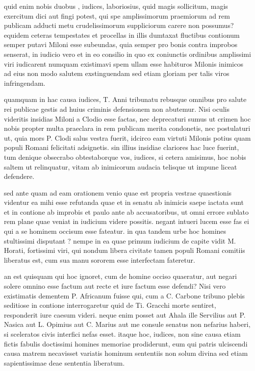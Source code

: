  quid enim nobis duobus , iudices, laboriosius, quid magis sollicitum, magis exercitum dici aut fingi potest, qui spe amplissimorum praemiorum ad rem publicam adducti metu crudelissimorum suppliciorum carere non possumus? equidem ceteras tempestates et procellas in illis dumtaxat fluctibus contionum semper putavi Miloni esse subeundas, quia semper pro bonis contra improbos senserat, in iudicio vero et in eo consilio in quo ex coniunctis ordinibus amplissimi viri iudicarent numquam existimavi spem ullam esse habituros Milonis inimicos ad eius non modo salutem exstinguendam sed etiam gloriam per talis viros infringendam.

 quamquam in hac causa iudices, T. Anni tribunatu rebusque omnibus pro salute rei publicae gestis ad huius criminis defensionem non abutemur. Nisi oculis videritis insidias Miloni a Clodio esse factas, nec deprecaturi sumus ut crimen hoc nobis propter multa praeclara in rem publicam merita condonetis, nec postulaturi ut, quia mors P. Clodi salus vestra fuerit, idcirco eam virtuti Milonis potius quam populi Romani felicitati adsignetis. sin illius insidiae clariores hac luce fuerint, tum denique obsecrabo obtestaborque vos, iudices, si cetera amisimus, hoc nobis saltem ut relinquatur, vitam ab inimicorum audacia telisque ut impune liceat defendere.

 sed ante quam ad eam orationem venio quae est propria vestrae quaestionis videntur ea mihi esse refutanda quae et in senatu ab inimicis saepe iactata sunt et in contione ab improbis et paulo ante ab accusatoribus, ut omni errore sublato rem plane quae veniat in iudicium videre possitis. negant intueri lucem esse fas ei qui a se hominem occisum esse fateatur. in qua tandem urbe hoc homines stultissimi disputant ? nempe in ea quae primum iudicium de capite vidit M. Horati, fortissimi viri, qui nondum libera civitate tamen populi Romani comitiis liberatus est, cum sua manu sororem esse interfectam fateretur.

 an est quisquam qui hoc ignoret, cum de homine occiso quaeratur, aut negari solere omnino esse factum aut recte et iure factum esse defendi? Nisi vero existimatis dementem P. Africanum fuisse qui, cum a C. Carbone tribuno plebis seditiose in contione interrogaretur quid de Ti. Gracchi morte sentiret, responderit iure caesum videri. neque enim posset aut Ahala ille Servilius aut P. Nasica aut L. Opimius aut C. Marius aut me consule senatus non nefarius haberi, si sceleratos civis interfici nefas esset. itaque hoc, iudices, non sine causa etiam fictis fabulis doctissimi homines memoriae prodiderunt, eum qui patris ulciscendi causa matrem necavisset variatis hominum sententiis non solum divina sed etiam sapientissimae deae sententia liberatum.

